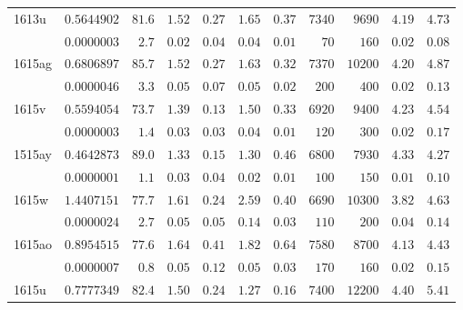 \begin{table}
\begin{tabular}{@{}l *{10}{r} }
\noalign{\smallskip}
1613u & $ 0.5644902$  & $      81.6$  & $      1.52$  & $      0.27$  & $      1.65$  & $      0.37$  & $7340$  & $9690$  & $      4.19$  & $      4.73$  \\
 & $ 0.0000003$  & $       2.7$  & $      0.02$  & $      0.04$  & $      0.04$  & $      0.01$  & $70$  & $160$  & $      0.02$  & $      0.08$  \\
\noalign{\smallskip}
1615ag & $ 0.6806897$  & $      85.7$  & $      1.52$  & $      0.27$  & $      1.63$  & $      0.32$  & $7370$  & $10200$  & $      4.20$  & $      4.87$  \\
 & $ 0.0000046$  & $       3.3$  & $      0.05$  & $      0.07$  & $      0.05$  & $      0.02$  & $200$  & $400$  & $      0.02$  & $      0.13$  \\
\noalign{\smallskip}
1615v & $ 0.5594054$  & $      73.7$  & $      1.39$  & $      0.13$  & $      1.50$  & $      0.33$  & $6920$  & $9400$  & $      4.23$  & $      4.54$  \\
 & $ 0.0000003$  & $       1.4$  & $      0.03$  & $      0.03$  & $      0.04$  & $      0.01$  & $120$  & $300$  & $      0.02$  & $      0.17$  \\
\noalign{\smallskip}
1515ay & $ 0.4642873$  & $      89.0$  & $      1.33$  & $      0.15$  & $      1.30$  & $      0.46$  & $6800$  & $7930$  & $      4.33$  & $      4.27$  \\
 & $ 0.0000001$  & $       1.1$  & $      0.03$  & $      0.04$  & $      0.02$  & $      0.01$  & $100$  & $150$  & $      0.01$  & $      0.10$  \\
\noalign{\smallskip}
1615w & $ 1.4407151$  & $      77.7$  & $      1.61$  & $      0.24$  & $      2.59$  & $      0.40$  & $6690$  & $10300$  & $      3.82$  & $      4.63$  \\
 & $ 0.0000024$  & $       2.7$  & $      0.05$  & $      0.05$  & $      0.14$  & $      0.03$  & $110$  & $200$  & $      0.04$  & $      0.14$  \\
\noalign{\smallskip}
1615ao & $ 0.8954515$  & $      77.6$  & $      1.64$  & $      0.41$  & $      1.82$  & $      0.64$  & $7580$  & $8700$  & $      4.13$  & $      4.43$  \\
 & $ 0.0000007$  & $       0.8$  & $      0.05$  & $      0.12$  & $      0.05$  & $      0.03$  & $170$  & $160$  & $      0.02$  & $      0.15$  \\
\noalign{\smallskip}
1615u & $ 0.7777349$  & $      82.4$  & $      1.50$  & $      0.24$  & $      1.27$  & $      0.16$  & $7400$  & $12200$  & $      4.40$  & $      5.41$  \\

\end{tabular}
\end{table}
